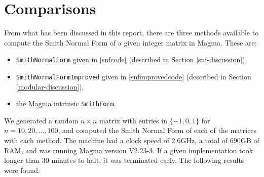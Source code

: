 \documentclass[12pt,a4paper]{article}
\theoremstyle{definition}
\begin{document}
\section{Comparisons}

From what has been discussed in this report, there are three methods available to compute the Smith Normal Form of a given integer matrix in {\sc Magma}. These are:
\begin{itemize}
\item \texttt{SmithNormalForm} given in \autoref{snfcode} (described in Section \ref{snf-discussion}), \item \texttt{SmithNormalFormImproved} given in \autoref{snfimprovedcode} (described in Section \ref{modular-discussion}),
\item the {\sc Magma} intrinsic \texttt{SmithForm}.
\end{itemize}

We generated a random $n\times n$ matrix with entries in $\{-1,0,1\}$ for $n=10,20,\ldots,100$, and computed the Smith Normal Form of each of the matrices with each method. The machine had a clock speed of 2.6GHz, a total of 690GB of RAM, and was running {\sc Magma} version V2.23-3. If a given implementation took longer than 30 minutes to halt, it was terminated early. The following results were found.
\end{document}
